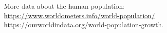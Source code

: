 \documentclass[12pt]{article}\usepackage[]{graphicx}\usepackage[]{xcolor}
\begin{document}
\vspace{24pt}

More data about the human population: \\
\url{https://www.worldometers.info/world-population/} \\
\url{https://ourworldindata.org/world-population-growth}.



\end{document}
